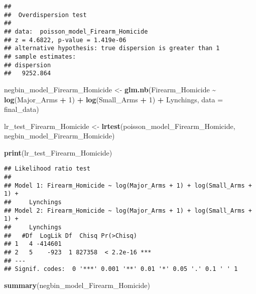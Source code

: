 \documentclass[
  11pt,
]{article}
\newenvironment{Shaded}{\begin{snugshade}}{\end{snugshade}}
\newcommand{\AttributeTok}[1]{\textcolor[rgb]{0.13,0.29,0.53}{#1}}
\newcommand{\DecValTok}[1]{\textcolor[rgb]{0.00,0.00,0.81}{#1}}
\newcommand{\FunctionTok}[1]{\textcolor[rgb]{0.13,0.29,0.53}{\textbf{#1}}}
\newcommand{\NormalTok}[1]{#1}
\newcommand{\OtherTok}[1]{\textcolor[rgb]{0.56,0.35,0.01}{#1}}
\newcommand{\SpecialCharTok}[1]{\textcolor[rgb]{0.81,0.36,0.00}{\textbf{#1}}}
\begin{document}
\begin{verbatim}
## 
##  Overdispersion test
## 
## data:  poisson_model_Firearm_Homicide
## z = 4.6822, p-value = 1.419e-06
## alternative hypothesis: true dispersion is greater than 1
## sample estimates:
## dispersion 
##   9252.864
\end{verbatim}

\begin{Shaded}
\begin{Highlighting}[]
\NormalTok{negbin\_model\_Firearm\_Homicide }\OtherTok{\textless{}{-}} \FunctionTok{glm.nb}\NormalTok{(Firearm\_Homicide }\SpecialCharTok{\textasciitilde{}} \FunctionTok{log}\NormalTok{(Major\_Arms }\SpecialCharTok{+} \DecValTok{1}\NormalTok{) }\SpecialCharTok{+} \FunctionTok{log}\NormalTok{(Small\_Arms }\SpecialCharTok{+} \DecValTok{1}\NormalTok{) }\SpecialCharTok{+}\NormalTok{ Lynchings,                                           }\AttributeTok{data =}\NormalTok{ final\_data)}

\NormalTok{lr\_test\_Firearm\_Homicide }\OtherTok{\textless{}{-}} \FunctionTok{lrtest}\NormalTok{(poisson\_model\_Firearm\_Homicide, negbin\_model\_Firearm\_Homicide)}

\FunctionTok{print}\NormalTok{(lr\_test\_Firearm\_Homicide) }
\end{Highlighting}
\end{Shaded}

\begin{verbatim}
## Likelihood ratio test
## 
## Model 1: Firearm_Homicide ~ log(Major_Arms + 1) + log(Small_Arms + 1) + 
##     Lynchings
## Model 2: Firearm_Homicide ~ log(Major_Arms + 1) + log(Small_Arms + 1) + 
##     Lynchings
##   #Df  LogLik Df  Chisq Pr(>Chisq)    
## 1   4 -414601                         
## 2   5    -923  1 827358  < 2.2e-16 ***
## ---
## Signif. codes:  0 '***' 0.001 '**' 0.01 '*' 0.05 '.' 0.1 ' ' 1
\end{verbatim}

\begin{Shaded}
\begin{Highlighting}[]
\FunctionTok{summary}\NormalTok{(negbin\_model\_Firearm\_Homicide)}
\end{Highlighting}
\end{Shaded}
\end{document}
